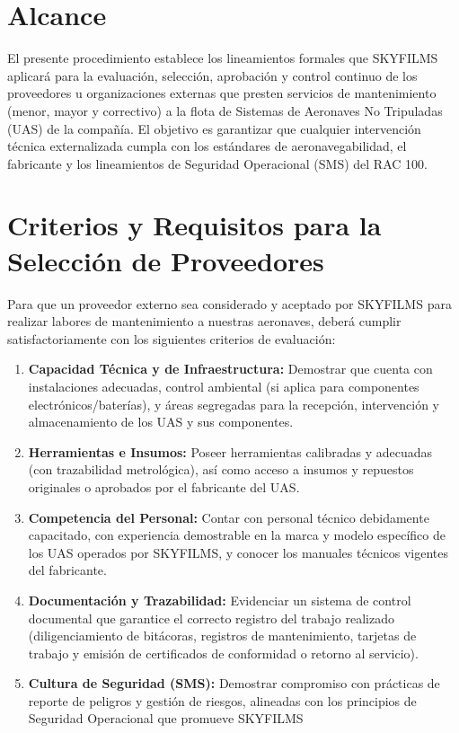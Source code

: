 \section{Alcance}
El presente procedimiento establece los lineamientos formales que SKYFILMS aplicará para la evaluación, selección, aprobación y control continuo de los proveedores u organizaciones externas que presten servicios de mantenimiento (menor, mayor y correctivo) a la flota de Sistemas de Aeronaves No Tripuladas (UAS) de la compañía. El objetivo es garantizar que cualquier intervención técnica externalizada cumpla con los estándares de aeronavegabilidad, el fabricante y los lineamientos de Seguridad Operacional (SMS) del RAC 100.

\section{Criterios y Requisitos para la Selección de Proveedores}
Para que un proveedor externo sea considerado y aceptado por SKYFILMS para realizar labores de mantenimiento a nuestras aeronaves, deberá cumplir satisfactoriamente con los siguientes criterios de evaluación:

\begin{enumerate}
    \item \textbf{Capacidad Técnica y de Infraestructura:} Demostrar que cuenta con instalaciones adecuadas, control ambiental (si aplica para componentes electrónicos/baterías), y áreas segregadas para la recepción, intervención y almacenamiento de los UAS y sus componentes.

    \item \textbf{Herramientas e Insumos:} Poseer herramientas calibradas y adecuadas (con trazabilidad metrológica), así como acceso a insumos y repuestos originales o aprobados por el fabricante del UAS.

    \item \textbf{Competencia del Personal:} Contar con personal técnico debidamente capacitado, con experiencia demostrable en la marca y modelo específico de los UAS operados por SKYFILMS, y conocer los manuales técnicos vigentes del fabricante.

    \item \textbf{Documentación y Trazabilidad:} Evidenciar un sistema de control documental que garantice el correcto registro del trabajo realizado (diligenciamiento de bitácoras, registros de mantenimiento, tarjetas de trabajo y emisión de certificados de conformidad o retorno al servicio).

    \item \textbf{Cultura de Seguridad (SMS):} Demostrar compromiso con prácticas de reporte de peligros y gestión de riesgos, alineadas con los principios de Seguridad Operacional que promueve SKYFILMS
\end{enumerate}

